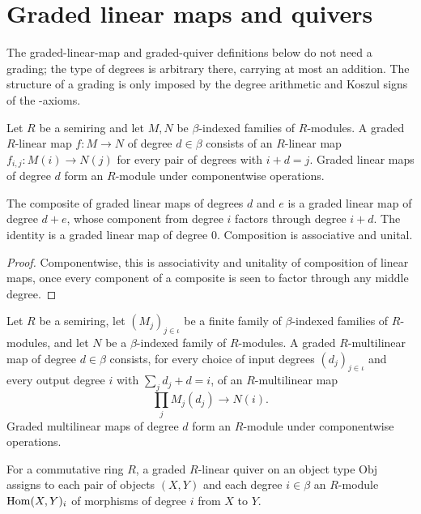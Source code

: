 \section{Graded linear maps and quivers}

The graded-linear-map and graded-quiver definitions below do not need a grading;
the type of degrees is arbitrary there, carrying at most an addition. The
structure of a grading is only imposed by the degree arithmetic and Koszul
signs of the \Ainf{}-axioms.

\begin{definition}
\label{AInfinityTheory.GradedLinearMap}
\leanok
Let $R$ be a semiring and let $M, N$ be $\beta$-indexed families of $R$-modules.
A graded $R$-linear map $f : M \to N$ of degree $d \in \beta$ consists of an
$R$-linear map $f_{i,j} : M(i) \to N(j)$ for every pair of degrees with
$i + d = j$. Graded linear maps of degree $d$ form an $R$-module under
componentwise operations.
\end{definition}

\begin{lemma}
\label{AInfinityTheory.GradedLinearMap.comp}
\leanok
{}
The composite of graded linear maps of degrees $d$ and $e$ is a graded linear map
of degree $d + e$, whose component from degree $i$ factors through degree $i + d$.
The identity is a graded linear map of degree $0$. Composition is associative and
unital.
\end{lemma}
\begin{proof}
\leanok
Componentwise, this is associativity and unitality of composition of linear maps,
once every component of a composite is seen to factor through any middle degree.
\end{proof}

\begin{definition}
\label{AInfinityTheory.GradedMultilinearMap}
\leanok
Let $R$ be a semiring, let $(M_j)_{j \in \iota}$ be a finite family of
$\beta$-indexed families of $R$-modules, and let $N$ be a $\beta$-indexed family of
$R$-modules. A graded $R$-multilinear map of degree $d \in \beta$ consists, for every
choice of input degrees $(d_j)_{j \in \iota}$ and every output degree $i$ with
$\sum_j d_j + d = i$, of an $R$-multilinear map
\[
  \prod_j M_j(d_j) \to N(i).
\]
Graded multilinear maps of degree $d$ form an $R$-module under componentwise
operations.
\end{definition}

\begin{definition}
\label{AInfinityTheory.GradedLinearQuiver}
\leanok
For a commutative ring $R$, a graded $R$-linear quiver on an object type
$\mathrm{Obj}$ assigns to each pair of objects $(X,Y)$ and each degree $i \in \beta$
an $R$-module $\operatorname{Hom}(X,Y)_i$ of morphisms of degree $i$ from $X$ to $Y$.
\end{definition}
